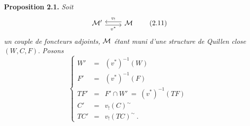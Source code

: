 \textbf{Proposition 2.1.} \textit{Soit}
\[
\begin{tikzcd}
\M' \arrow[r, shift right, "v^*"'] & \M \arrow[l, shift right, "v_!"']
\end{tikzcd}
\tag*{(2.11)} %
\]
\textit{un couple de foncteurs adjoints, $\mathcal{M}$ étant muni d'une structure de Quillen close} $(W,C,F)$. \textit{Posons}
\[
\left\{
\begin{array}{rcl}
W' & = & (v^*)^{-1}(W)\\
F' & = & (v^*)^{-1}(F)\\
TF' & = & F' \cap W' \ = \ (v^*)^{-1}(TF)\\
C' & = & v_!(C)^{\sim}\\
TC' & = & v_!(TC)^{\sim}\ .
\end{array}\right.
\tag*{(2.1.2)}
\]

